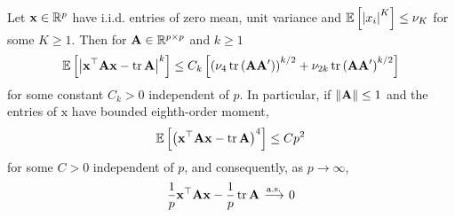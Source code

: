 \begin{lemma} \label{lem:quadratic-form-close-to-the-trace}
	Let ${\bf x} \in {\mathbb R}^{p}$ have i.i.d. entries of zero mean, unit variance and ${\mathbb E}\left[\left|x_{i}\right|^{K}\right] \leq \nu_{K}$ for some $K \geq 1 .$ Then for ${\bf A} \in {\mathbb R}^{p \times p}$ and $k \geq 1$
	$$
		{\mathbb E}\left[\left|{\bf x}^{\top} {\bf A} {\bf x}-\operatorname{tr} {\bf A}\right|^{k}\right] \leq C_{k}\left[\left(\nu_{4} \operatorname{tr}\left({\bf A} {\bf A}^{\prime}\right)\right)^{k / 2}+\nu_{2 k} \operatorname{tr}\left({\bf A} {\bf A}^{\prime}\right)^{k / 2}\right]
	$$
	for some constant $C_{k}>0$ independent of $p .$ In particular, if $\|{\bf A}\| \leq 1$ and the entries of $\mathrm{x}$ have bounded eighth-order moment,
	$$
		{\mathbb E}\left[\left({\bf x}^{\top} {\bf A} {\bf x}-\operatorname{tr} {\bf A}\right)^{4}\right] \leq C p^{2}
	$$
	for some $C>0$ independent of $p$, and consequently, as $p \rightarrow \infty$,
	$$
		\frac{1}{p} {\bf x}^{\top} {\bf A} {\bf x}-\frac{1}{p} \operatorname{tr} {\bf A} \stackrel{\text { a.s. }}{\longrightarrow} 0
	$$
\end{lemma}
